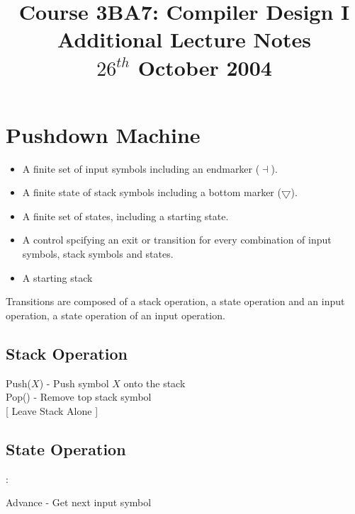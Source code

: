 \documentclass[a4paper,12pt]{article}
\begin{document}
\title{Course 3BA7: Compiler Design I \\ Additional Lecture Notes \\ $26^{th}$ October 2004}

\maketitle

\section{Pushdown Machine}

\begin{itemize}

\item A finite set of input symbols including an endmarker ($\dashv$).

\item A finite state of stack symbols including a bottom marker
($\bigtriangledown$).

\item A finite set of states, including a starting state.

\item A control spcifying an exit or transition for every combination of
input symbols, stack symbols and states.

\item A starting stack

\end{itemize}


Transitions are composed of a stack operation, a state operation and an
input operation, a state operation of an input operation.

\subsection*{Stack Operation}

Push($X$) - Push symbol $X$ onto the stack \\

Pop() - Remove top stack symbol \\

[ Leave Stack Alone ]


\subsection*{State Operation}:

Advance - Get next input symbol \\
\end{document}

